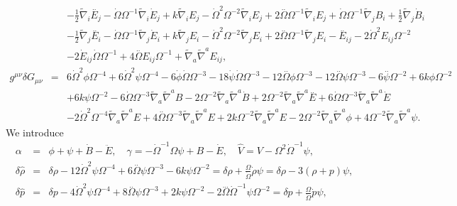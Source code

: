 \documentclass[aps,onecolumn,10pt]{revtex4}
\numberwithin{equation}{section}
\numberwithin{equation}{section}
\begin{document}
\begin{eqnarray}
\nonumber \\ 
&& -  \tfrac{1}{2} \tilde{\nabla}_{i}\overset{..}{E}_{j} -  \dot{\Omega} \Omega^{-1} \tilde{\nabla}_{i}\dot{E}_{j} + k \tilde{\nabla}_{i}E_{j} -  \dot{\Omega}^2 \Omega^{-2} \tilde{\nabla}_{i}E_{j} + 2 \overset{..}{\Omega} \Omega^{-1} \tilde{\nabla}_{i}E_{j} + \dot{\Omega} \Omega^{-1} \tilde{\nabla}_{j}B_{i} + \tfrac{1}{2} \tilde{\nabla}_{j}\dot{B}_{i} \nonumber \\ 
&& -  \tfrac{1}{2} \tilde{\nabla}_{j}\overset{..}{E}_{i} -  \dot{\Omega} \Omega^{-1} \tilde{\nabla}_{j}\dot{E}_{i} + k \tilde{\nabla}_{j}E_{i} -  \dot{\Omega}^2 \Omega^{-2} \tilde{\nabla}_{j}E_{i} + 2 \overset{..}{\Omega} \Omega^{-1} \tilde{\nabla}_{j}E_{i}- \overset{..}{E}_{ij} - 2 \dot{\Omega}^2 E_{ij} \Omega^{-2} \nonumber \\ 
&& - 2 \dot{E}_{ij} \dot{\Omega} \Omega^{-1} + 4 \overset{..}{\Omega} E_{ij} \Omega^{-1} + \tilde{\nabla}_{a}\tilde{\nabla}^{a}E_{ij},
 \nonumber\\
g^{\mu\nu}\delta G_{\mu\nu} &=& 6 \dot{\Omega}^2 \phi \Omega^{-4} + 6 \dot{\Omega}^2 \psi \Omega^{-4} - 6 \dot{\phi} \dot{\Omega} \Omega^{-3} - 18 \dot{\psi} \dot{\Omega} \Omega^{-3} - 12 \overset{..}{\Omega} \phi \Omega^{-3} - 12 \overset{..}{\Omega} \psi \Omega^{-3} - 6 \overset{..}{\psi} \Omega^{-2} + 6 k \phi \Omega^{-2} \nonumber \\ 
&& + 6 k \psi \Omega^{-2} - 6 \dot{\Omega} \Omega^{-3} \tilde{\nabla}_{a}\tilde{\nabla}^{a}B - 2 \Omega^{-2} \tilde{\nabla}_{a}\tilde{\nabla}^{a}\dot{B} + 2 \Omega^{-2} \tilde{\nabla}_{a}\tilde{\nabla}^{a}\overset{..}{E} + 6 \dot{\Omega} \Omega^{-3} \tilde{\nabla}_{a}\tilde{\nabla}^{a}\dot{E} \nonumber \\ 
&& - 2 \dot{\Omega}^2 \Omega^{-4} \tilde{\nabla}_{a}\tilde{\nabla}^{a}E + 4 \overset{..}{\Omega} \Omega^{-3} \tilde{\nabla}_{a}\tilde{\nabla}^{a}E + 2 k \Omega^{-2} \tilde{\nabla}_{a}\tilde{\nabla}^{a}E - 2 \Omega^{-2} \tilde{\nabla}_{a}\tilde{\nabla}^{a}\phi + 4 \Omega^{-2} \tilde{\nabla}_{a}\tilde{\nabla}^{a}\psi. 
\label{9.11}
\end{eqnarray}
%
We introduce
%
\begin{eqnarray}
\alpha  &=& \phi + \psi + \dot B - \ddot E,\quad \gamma = - \dot\Omega^{-1}\Omega \psi + B - \dot E,\quad \hat{V} = V-\Omega^2 \dot \Omega^{-1}\psi,
 \nonumber\\
\delta \hat{\rho}&=&\delta \rho - 12 \dot{\Omega}^2 \psi \Omega^{-4} + 6 \overset{..}{\Omega} \psi \Omega^{-3} - 6 k \psi \Omega^{-2}=\delta\rho +\frac{\Omega}{\dot{\Omega}}\dot{\rho}\psi=\delta \rho-3(\rho+p)\psi,
\nonumber\\
\delta \hat{p}&=&\delta p - 4 \dot{\Omega}^2 \psi \Omega^{-4} + 8 \overset{..}{\Omega} \psi \Omega^{-3} + 2 k \psi \Omega^{-2} - 2 \overset{...}{\Omega} \dot{\Omega}^{-1} \psi \Omega^{-2}=\delta p +\frac{\Omega}{\dot{\Omega}}\dot{p}\psi,
\label{9.12}
\end{eqnarray}
\end{document}
